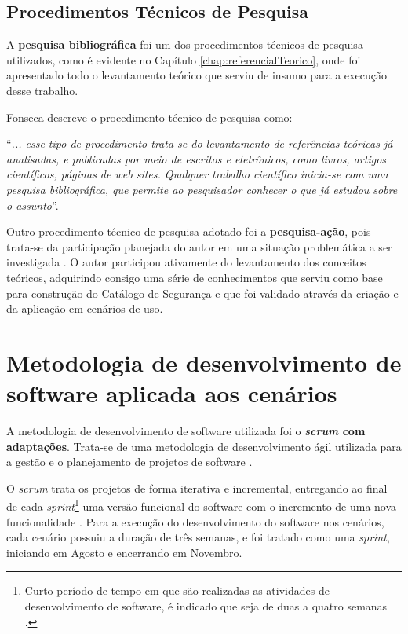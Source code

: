 \subsection{Procedimentos Técnicos de Pesquisa}
\label{sub:procedimentosDePesquisa}

A \textbf{pesquisa bibliográfica} foi um dos procedimentos técnicos de pesquisa utilizados, como é evidente no Capítulo \ref{chap:referencialTeorico}, onde foi apresentado todo o levantamento teórico que serviu de insumo para a execução desse trabalho. 

Fonseca descreve o procedimento técnico de pesquisa como:

\begin{citacao}
	“\textit{... esse tipo de procedimento trata-se do levantamento de referências teóricas já analisadas, e publicadas por meio de escritos e eletrônicos, como livros, artigos científicos, páginas de web sites. Qualquer trabalho científico inicia-se com uma pesquisa bibliográfica, que permite ao pesquisador conhecer o que já estudou sobre o assunto}”.
	\cite[p.35]{fonseca2002metodologia}
\end{citacao}
 
 
Outro procedimento técnico de pesquisa adotado foi a \textbf{pesquisa-ação}, pois trata-se da participação planejada do autor em uma situação problemática a ser investigada \cite{fonseca2002metodologia}. O autor participou ativamente do levantamento dos conceitos teóricos, adquirindo consigo uma série de conhecimentos que serviu como base para construção do Catálogo de Segurança e que foi validado através da criação e da aplicação em cenários de uso. 
 

\section{Metodologia de desenvolvimento de software aplicada aos cenários}
\label{sec:metodologiaDeDesenvolvimentoDeSoftware}


A metodologia de desenvolvimento de software utilizada foi o  \textbf{\textit{scrum} com adaptações}. Trata-se de uma metodologia de desenvolvimento ágil utilizada para a gestão e o planejamento de projetos de software \cite{schwaber2002agile}. 

O \textit{scrum} trata os projetos de forma iterativa e incremental, entregando ao final de cada \textit{sprint}\footnote[1]{Curto período de tempo em que são realizadas as atividades de desenvolvimento de software, é indicado que seja de duas a quatro semanas \cite{schwaber2002agile}.} uma versão funcional do software com o incremento de uma nova funcionalidade \cite{schwaber2002agile}. Para a execução do desenvolvimento do software nos cenários, cada cenário possuiu a duração de três semanas, e foi tratado como uma \textit{sprint}, iniciando em Agosto e encerrando em Novembro.  
 
